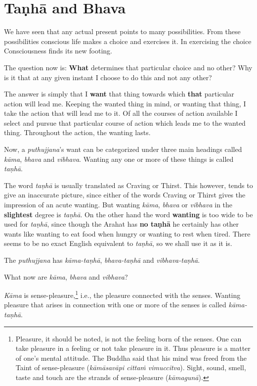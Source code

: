\chapter{Taṇhā and Bhava}

We have seen that any actual present points to many possibilities. From these possibilities conscious life makes a choice and exercises it. In exercising the choice Consciousness finds its new footing.

The question now is: \textbf{What} determines that particular choice and no other? Why is it that at any given instant I choose to do this and not any other?

The answer is simply that I \textbf{want} that thing towards which \textbf{that} particular action will lead me. Keeping the wanted thing in mind, or wanting that thing, I take the action that will lead me to it. Of all the courses of action available I select and pursue that particular course of action which leads me to the wanted thing. Throughout the action, the wanting lasts.

Now, a \emph{puthujjana}'s want can be categorized under three main headings called \emph{kāma}, \emph{bhava} and \emph{vibhava}. Wanting any one or more of these things is called \emph{taṇhā}.

The word \emph{taṇhā} is usually translated as Craving or Thirst. This however, tends to give an inaccurate picture, since either of the words Craving or Thirst gives the impression of an acute wanting. But wanting \emph{kāma}, \emph{bhava} or \emph{vibhava} in the \textbf{slightest} degree is \emph{taṇhā}. On the other hand the word \textbf{wanting} is too wide to be used for \emph{taṇhā}, since though the Arahat has \textbf{no taṇhā} he certainly has other wants like wanting to eat food when hungry or wanting to rest when tired. There seems to be no exact English equivalent to \emph{taṇhā}, so we shall use it as it is.

The \emph{puthujjana} has \emph{kāma-taṇhā}, \emph{bhava-taṇhā} and \emph{vibhava-taṇhā}.

What now are \emph{kāma}, \emph{bhava} and \emph{vibhava}?

\emph{Kāma} is sense-pleasure,\footnote{Pleasure, it should be noted, is not the feeling born of the senses. One can take pleasure in a feeling or not take pleasure in it. Thus pleasure is a matter of one's mental attitude. The Buddha said that his mind was freed from the Taint of sense-pleasure (\emph{kāmāsavāpi cittaṁ vimuccitva}). Sight, sound, smell, taste and touch are the strands of sense-pleasure (\emph{kāmagunā}).} i.e., the pleasure connected with the senses. Wanting pleasure that arises in connection with one or more of the senses is called \emph{kāma-taṇhā}.

